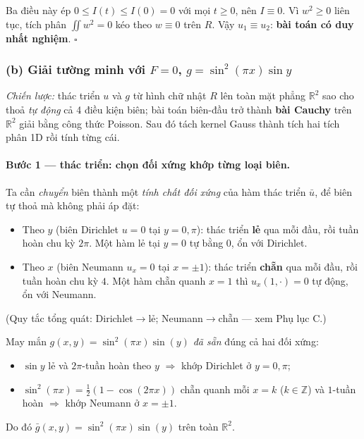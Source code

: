 Ba điều này ép $0\le I(t)\le I(0)=0$ với mọi $t\ge0$, nên $I\equiv0$. Vì $w^2\ge0$ liên tục, tích phân $\iint w^2=0$ kéo theo $w\equiv0$ trên $R$. Vậy $u_1\equiv u_2$: \textbf{bài toán có duy nhất nghiệm}. \hfill$\square$

\subsubsection*{(b) Giải tường minh với $F=0$, $g=\sin^2(\pi x)\sin y$}

\emph{Chiến lược:} thác triển $u$ và $g$ từ hình chữ nhật $R$ lên toàn mặt phẳng $\mathbb R^2$ sao cho thoả \emph{tự động} cả 4 điều kiện biên; bài toán biên-đầu trở thành \textbf{bài Cauchy} trên $\mathbb R^2$ giải bằng công thức Poisson. Sau đó tách kernel Gauss thành tích hai tích phân 1D rồi tính từng cái.

\paragraph{Bước 1 --- thác triển: chọn đối xứng khớp từng loại biên.}\leavevmode

Ta cần \emph{chuyển} biên thành một \emph{tính chất đối xứng} của hàm thác triển $\bar u$, để biên tự thoả mà không phải áp đặt:
\begin{itemize}
\item Theo $y$ (biên Dirichlet $u=0$ tại $y=0,\pi$): thác triển \textbf{lẻ} qua mỗi đầu, rồi tuần hoàn chu kỳ $2\pi$. Một hàm lẻ tại $y=0$ tự bằng $0$, ổn với Dirichlet.
\item Theo $x$ (biên Neumann $u_x=0$ tại $x=\pm1$): thác triển \textbf{chẵn} qua mỗi đầu, rồi tuần hoàn chu kỳ $4$. Một hàm chẵn quanh $x=1$ thì $u_x(1,\cdot)=0$ tự động, ổn với Neumann.
\end{itemize}
(Quy tắc tổng quát: Dirichlet$\to$lẻ; Neumann$\to$chẵn --- xem Phụ lục C.)

May mắn $g(x,y)=\sin^2(\pi x)\sin(y)$ \emph{đã sẵn} đúng cả hai đối xứng:
\begin{itemize}
\item $\sin y$ lẻ và $2\pi$-tuần hoàn theo $y$ $\Rightarrow$ khớp Dirichlet ở $y=0,\pi$;
\item $\sin^2(\pi x)=\tfrac12(1-\cos(2\pi x))$ chẵn quanh mỗi $x=k$ ($k\in\mathbb Z$) và $1$-tuần hoàn $\Rightarrow$ khớp Neumann ở $x=\pm1$.
\end{itemize}
Do đó $\bar g(x,y)=\sin^2(\pi x)\sin(y)$ trên toàn $\mathbb R^2$.

